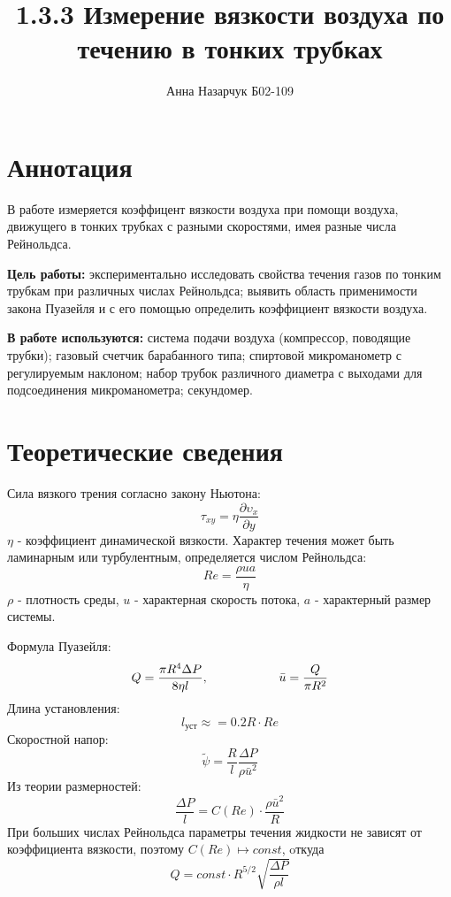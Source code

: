 \documentclass[a4paper,12pt]{article} %
\author{Анна Назарчук Б02-109}
\title{1.3.3 Измерение вязкости воздуха по течению в тонких трубках}
\date{}
\begin{document}
\maketitle
\section{Аннотация}
В работе измеряется коэффицент вязкости воздуха при помощи воздуха, движущего в тонких трубках с разными скоростями, имея разные числа Рейнольдса.

\textbf{Цель работы:} экспериментально исследовать свойства течения газов по тонким трубкам при различных числах Рейнольдса; выявить область применимости закона Пуазейля и с его помощью определить коэффициент вязкости воздуха.

\textbf{В работе используются:}  система подачи воздуха (компрессор, поводящие трубки); газовый счетчик барабанного типа; спиртовой микроманометр с регулируемым наклоном; набор трубок различного диаметра с выходами для подсоединения микроманометра; секундомер.

\section{Теоретические сведения}
Сила вязкого трения согласно закону Ньютона:
\begin{equation}
\tau_{xy} = \eta \frac{\partial \upsilon_x}{\partial y}
\end{equation}
$\eta$ - коэффициент динамической вязкости.
Характер течения может быть ламинарным или турбулентным, определяется числом Рейнольдса:
\begin{equation}
Re = \frac{\rho u a}{\eta}
\end{equation} 
$\rho$ - плотность среды, $u$ - характерная скорость потока, $a$ - характерный размер системы.

Формула Пуазейля:
\begin{equation}
Q = \frac{\pi R^4\Delta P}{8\eta l}, \hspace*{20mm} \bar{u} = \frac{Q}{\pi R^2}
\end{equation}
Длина установления:
\begin{equation}
\label{длина}
l_{уст} \approx = 0.2R\cdot Re
\end{equation}
Скоростной напор:
\begin{equation}
\tilde{\psi} = \frac{R}{l}\frac{\Delta P}{\rho \bar{u}^2}
\end{equation}
Из теории размерностей:
\begin{equation}
\frac{\Delta P}{l} = C(Re)\cdot \frac{\rho \bar{u}^2}{R}
\end{equation}
При больших числах Рейнольдса параметры течения жидкости не зависят от коэффициента вязкости, поэтому $C(Re)\mapsto const$, oткуда
\begin{equation}
Q = const \cdot R^{5/2} \sqrt{\frac{\Delta P}{\rho l}}
\end{equation}
\end{document}
